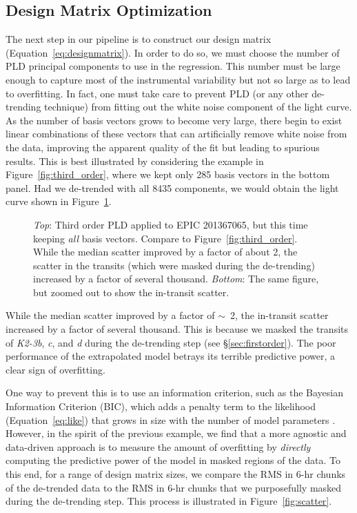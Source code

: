 \documentclass[]{emulateapj}
\begin{document}
\subsection{Design Matrix Optimization}
\label{sec:dmopt}
The next step in our pipeline is to construct our design matrix 
(Equation~\ref{eq:designmatrix}). In order to do so, we must choose the
number of PLD principal components to use in the regression. This number must be
large enough to capture most of the instrumental variability
but not so large as to lead to overfitting. In fact, one must take care
to prevent PLD (or any other de-trending technique) from fitting out the white noise 
component of the light curve. As the number of basis vectors grows to become very large, 
there begin to exist linear combinations of these vectors that can artificially remove 
white noise from the data, improving the apparent quality of the fit but leading to spurious 
results. This is best illustrated by considering the example in Figure~\ref{fig:third_order}, 
where we kept only 285 basis vectors in the bottom panel. Had we de-trended with all 
8435 components, we would obtain the light curve shown in Figure~\ref{fig:overfitting}.
\begin{figure}[h]
  \begin{center}
       \caption{\emph{Top}: Third order PLD applied to EPIC 201367065, but this time keeping 
                \emph{all} basis vectors. Compare to 
                Figure~\ref{fig:third_order}. While the median scatter improved by a factor
                of about 2, the scatter in the transits (which were masked during the de-trending)
                increased by a factor of several thousand. \emph{Bottom}: The same figure, 
                but zoomed out to show the in-transit scatter.}
     \label{fig:overfitting}
  \end{center}
\end{figure}
While the median scatter improved by a factor of $\sim$~2, the in-transit scatter increased
by a factor of several thousand. This is because we masked the transits of \emph{K2-3b},
\emph{c}, and \emph{d} during the de-trending step (see \S\ref{sec:firstorder}). The poor
performance of the extrapolated model betrays its terrible predictive power, a clear sign
of overfitting.

One way to prevent this is to use an information criterion, such as the Bayesian Information 
Criterion (BIC), which adds a penalty term to the likelihood (Equation~\ref{eq:like}) 
that grows in size with the number of model parameters \citep[see, e.g.,][]{DFM15}.
However, in the spirit of the previous example, we find that a more agnostic and data-driven
approach is to measure the amount of overfitting by \emph{directly} computing the predictive power
of the model in masked regions of the data. To this end, for a range of design matrix sizes, we 
compare the RMS in 6-hr chunks of the de-trended data to the RMS in 6-hr chunks that we purposefully 
masked during the de-trending step. This process is illustrated in Figure~\ref{fig:scatter}.
\end{document}
